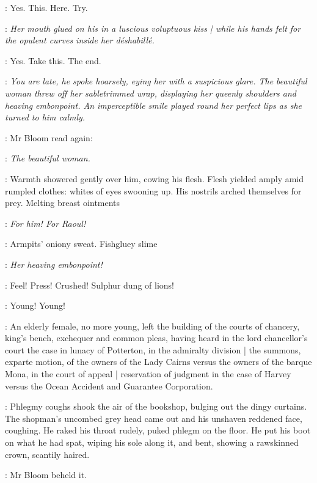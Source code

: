\BloomInt:
Yes.
This.
Here.
Try.

\BloomInt:
\emph{Her mouth glued on his in a luscious voluptuous kiss |
while his hands felt for the opulent curves inside her déshabillé.}

\BloomInt:
Yes.
Take this.
The end.

\BloomInt:
\emph{You are late,
he spoke hoarsely,
eying her with a suspicious glare.
The beautiful woman threw off her sabletrimmed wrap,
displaying her queenly shoulders and heaving embonpoint.
An imperceptible smile played round her perfect lips
as she turned to him calmly.}

:
Mr Bloom read again:

\BloomInt:
\emph{The beautiful woman.}

\BloomInt:
Warmth showered gently over him,
cowing his flesh.
Flesh yielded amply amid rumpled clothes:
whites of eyes swooning up.
His nostrils arched themselves for prey.
Melting breast ointments

\BloomInt:
\emph{For him!
For Raoul!}

\BloomInt:
Armpits' oniony sweat.
Fishgluey slime

\BloomInt:
\emph{Her heaving embonpoint!}

\BloomInt:
Feel!
Press!
Crushed!
Sulphur dung of lions!

\BloomInt:
Young!
Young!

\begin{mdframed}
    :
    An elderly female,
    no more young,
    left the building of the courts of chancery,
    king's bench,
    exchequer
    and common pleas,
    having heard in the lord chancellor's court
    the case in lunacy of Potterton,
    in the admiralty division |
    the summons,
    exparte motion,
    of the owners of the Lady Cairns
    versus the owners of the barque Mona,
    in the court of appeal |
    reservation of judgment
    in the case of Harvey versus
    the Ocean Accident and Guarantee Corporation.
\end{mdframed}

:
Phlegmy coughs shook the air of the bookshop,
bulging out the dingy curtains.
The shopman's uncombed grey head came out
and his unshaven reddened face,
coughing.
He raked his throat rudely,
puked phlegm on the floor.
He put his boot on what he had spat,
wiping his sole along it,
and bent,
showing a rawskinned crown,
scantily haired.

:
Mr Bloom beheld it.


